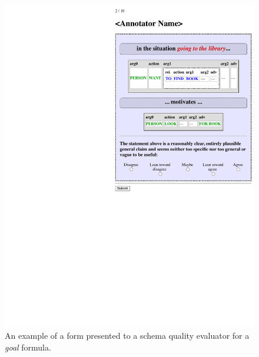 \begin{figure}
\centering
\begin{minipage}[t][.4\textheight]{.38\columnwidth}
    \centering
    \includegraphics[width=\textwidth]{CH4_learning/evaleg4.pdf}
    \caption{An example of a form presented to a schema quality evaluator for a \textit{goal} formula.}
    \label{fig:goal_eval_eg}
\end{minipage}%
\hfill
\begin{minipage}[t][.4\textheight]{.4\columnwidth}
    \centering

\end{minipage}
\end{figure}
